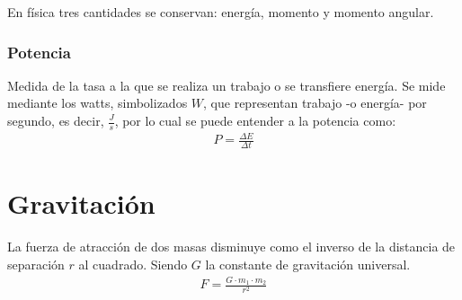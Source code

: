 \documentclass[12pt]{article}
\begin{document}
En física tres cantidades se conservan: 
energía, momento y momento angular.

\subsubsection{Potencia}

Medida de la tasa a la que se realiza un trabajo o se transfiere energía.
Se mide mediante los watts, simbolizados \(W\),
que representan trabajo -o energía- por segundo, es decir,
\(\frac{J}{s}\), por lo cual se puede entender a la potencia como:
\begin{align*}
  P = \frac{\Delta E}{\Delta t}
\end{align*}

\section{Gravitación}

La fuerza de atracción de dos masas disminuye como el inverso de la distancia
de separación \(r\) al cuadrado. Siendo \(G\) la constante de gravitación 
universal.
\begin{align*}
  F = \frac{G\cdot m_{1}\cdot m_{2}}{r^{2}}
\end{align*}
\end{document}
